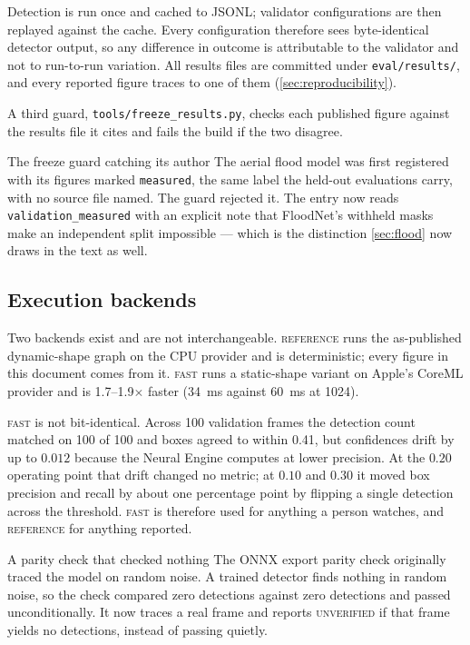 Detection is run once and cached to JSONL; validator configurations are then
replayed against the cache. Every configuration therefore sees byte-identical
detector output, so any difference in outcome is attributable to the validator
and not to run-to-run variation. All results files are committed under
\texttt{eval/results/}, and every reported figure traces to one of them
(\cref{sec:reproducibility}).

A third guard, \texttt{tools/freeze\_results.py}, checks each published figure
against the results file it cites and fails the build if the two disagree.

\begin{recorded}{The freeze guard catching its author}
The aerial flood model was first registered with its figures marked
\texttt{measured}, the same label the held-out evaluations carry, with no
source file named. The guard rejected it. The entry now reads
\texttt{validation\_measured} with an explicit note that FloodNet's withheld
masks make an independent split impossible — which is the distinction
\cref{sec:flood} now draws in the text as well.
\end{recorded}

\subsection{Execution backends}
\label{sec:backends}

Two backends exist and are not interchangeable. \textsc{reference} runs the
as-published dynamic-shape graph on the CPU provider and is deterministic;
every figure in this document comes from it. \textsc{fast} runs a static-shape
variant on Apple's CoreML provider and is 1.7--1.9$\times$ faster
(\SI{34}{\milli\second} against \SI{60}{\milli\second} at \SI{1024}{\pixel}).

\textsc{fast} is not bit-identical. Across 100 validation frames the detection
count matched on 100 of 100 and boxes agreed to within \SI{0.41}{\pixel}, but
confidences drift by up to $0.012$ because the Neural Engine computes at lower
precision. At the $0.20$ operating point that drift changed no metric; at
$0.10$ and $0.30$ it moved box precision and recall by about one percentage
point by flipping a single detection across the threshold. \textsc{fast} is
therefore used for anything a person watches, and \textsc{reference} for
anything reported.

\begin{recorded}{A parity check that checked nothing}
The ONNX export parity check originally traced the model on random noise. A
trained detector finds nothing in random noise, so the check compared zero
detections against zero detections and passed unconditionally. It now traces a
real frame and reports \textsc{unverified} if that frame yields no detections,
instead of passing quietly.
\end{recorded}

